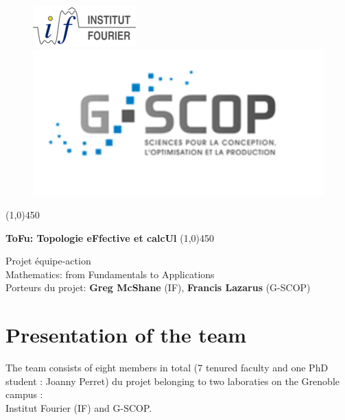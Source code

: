 \documentclass[14pt,fleqn]{article}
\begin{document}
 \begin{figure}[H]
  \centering
  \subfloat  
{\includegraphics[scale=1]{iflogo-azur-sable-150x60_0.png}  
}
 \hfill
  \subfloat
  {\includegraphics[scale=.4]{gscop.png}  
}

\end{figure}


\begin{center}
\line(1,0){450}

\vspace{0.2in}
{\huge \bf ToFu: Topologie eFfective et calcUl}
\vspace{0.2in}
\line(1,0){450}
\bigskip

Projet équipe-action  \\
Mathematics: from Fundamentals to Applications
\\
Porteurs du projet:  {\bf Greg McShane} (IF),  {\bf Francis Lazarus} (G-SCOP)
\end{center}


\tableofcontents

\newpage

\section{Presentation of the team}
The team consists of eight members in total (7 tenured faculty and one PhD student : Joanny Perret) du projet belonging to two  laboraties on the Grenoble campus : \\
Institut Fourier (IF) and G-SCOP.
\end{document}
